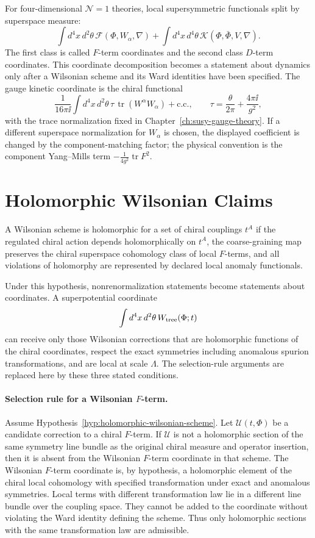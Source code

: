For four-dimensional \(\mathcal N=1\) theories, local supersymmetric
functionals split by superspace measure:
\[
  \int d^4x\,d^2\theta\,\mathcal F(\Phi,W_\alpha,\nabla)
  +\int d^4x\,d^4\theta\,\mathcal K(\Phi,\bar\Phi,V,\nabla).
\]
The first class is called \(F\)-term coordinates and the second class
\(D\)-term coordinates.  This coordinate decomposition becomes a statement
about dynamics only after a Wilsonian scheme and its Ward identities have
been specified.  The gauge kinetic coordinate is the chiral functional
\[
  \frac{1}{16\pi\ii}\int d^4x\,d^2\theta\,
  \tau\,\operatorname{tr}(W^\alpha W_\alpha)+\text{c.c.},
  \qquad
  \tau=\frac{\theta}{2\pi}+\frac{4\pi\ii}{g^2},
\]
with the trace normalization fixed in
Chapter~\ref{ch:susy-gauge-theory}.  If a different superspace normalization
for \(W_\alpha\) is chosen, the displayed coefficient is changed by the
component-matching factor; the physical convention is the component
Yang--Mills term \(-\frac{1}{4g^2}\operatorname{tr}F^2\).

\section{Holomorphic Wilsonian Claims}

\begin{hypothesis}
\label{hyp:holomorphic-wilsonian-scheme}
A Wilsonian scheme is holomorphic for a set of chiral couplings \(t^A\) if
the regulated chiral action depends holomorphically on \(t^A\), the
coarse-graining map preserves the chiral superspace cohomology class of local
\(F\)-terms, and all violations of holomorphy are represented by declared
local anomaly functionals.
\end{hypothesis}

Under this hypothesis, nonrenormalization statements become statements about
coordinates.  A superpotential coordinate
\[
  \int d^4x\,d^2\theta\, W_{\rm tree}(\Phi;t)
\]
can receive only those Wilsonian corrections that are holomorphic functions
of the chiral coordinates, respect the exact symmetries including anomalous
spurion transformations, and are local at scale \(\Lambda\).  The
selection-rule arguments are replaced here by these three stated conditions.

\paragraph{Selection rule for a Wilsonian \(F\)-term.}
Assume Hypothesis~\ref{hyp:holomorphic-wilsonian-scheme}.  Let
\(\mathcal U(t,\Phi)\) be a candidate correction to a chiral \(F\)-term.  If
\(\mathcal U\) is not a holomorphic section of the same symmetry line bundle
as the original chiral measure and operator insertion, then it is absent from
the Wilsonian \(F\)-term coordinate in that scheme.
The Wilsonian \(F\)-term coordinate is, by hypothesis, a holomorphic element
of the chiral local cohomology with specified transformation under exact and
anomalous symmetries.  Local terms with different transformation law lie in a
different line bundle over the coupling space.  They cannot be added to the
coordinate without violating the Ward identity defining the scheme.  Thus
only holomorphic sections with the same transformation law are admissible.

